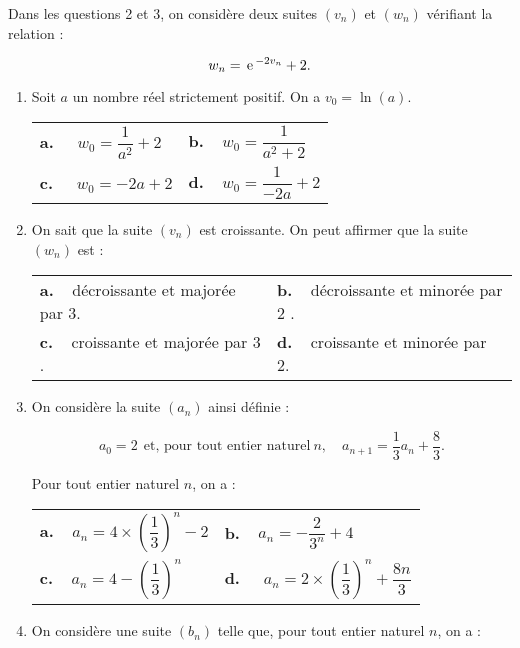 \documentclass[10pt,a4paper]{article}
\newcommand{\e}{\,\text{e\,}}%
\begin{document}
Dans les questions 2 et 3, on considère deux suites $\left(v_n\right)$  et $\left(w_n\right)$ vérifiant la relation : 

\[w_n = \e^{- 2v_n} + 2.\]

\begin{enumerate}[resume]
\item  Soit $a$ un nombre réel strictement positif. On a $v_0 = \ln (a)$.

\begin{center}
\begin{tabularx}{\linewidth}{X X}
\textbf{a.~~} $w_0 = \dfrac{1}{a^2}  +2$&\textbf{b.~~}$w_0 = \dfrac{1}{a^2  +2}$\\
\textbf{c.~~} $w_0 = -2a +2$&\textbf{d.~~}$w_0 = \dfrac{1}{- 2a} + 2$
\end{tabularx}
\end{center}

\item On sait que la suite $\left(v_n\right)$ est croissante. On peut affirmer que la suite $\left(w_n\right)$ est :

\begin{center}
\begin{tabularx}{\linewidth}{X X}
\textbf{a.~~}décroissante et majorée par 3.&\textbf{b.~~}décroissante et minorée par 2 .\\
\textbf{c.~~}croissante et majorée par 3 .&\textbf{d.~~}croissante et minorée par 2.
\end{tabularx}
\end{center}

\item On considère la suite $\left(a_n\right)$ ainsi définie :

\[a_0 = 2 \:\:\text{et, pour tout entier naturel}\: n, \quad a_{n+1} = \dfrac13a_n + \dfrac83.\]


Pour tout entier naturel $n$, on a :
\begin{center}
\begin{tabularx}{\linewidth}{X X}
\textbf{a.~~}$a_n = 4 \times \left(\dfrac13\right)^n - 2$&\textbf{b.~~}$a_n = - \dfrac{2}{3^n} + 4$\\
\textbf{c.~~}$a_n = 4 - \left(\dfrac13\right)^n$ & \textbf{d.~~} $a_n = 2 \times \left(\dfrac13\right)^n + \dfrac{8n}{3}$
\end{tabularx}
\end{center}
\item On considère une suite $\left(b_n\right)$ telle que, pour tout entier naturel $n$, on a :


\end{enumerate}
\end{document}
